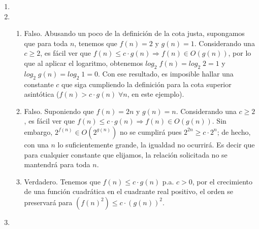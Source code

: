 \documentclass[12pt]{article}
\newenvironment{boenumerate}
               {\begin{enumerate}\renewcommand\labelenumi{\textbf{\theenumi.}}}
               {\end{enumerate}}
\begin{document}
\begin{boenumerate}
  Ahora veamos que $f_1(n) = n^{2.5} = n^{2+0.5} = n^2 \cdot n^{\frac{1}{2}}$, comparándolo con $f_6(n)$, al tener que $log_2(n) \leq n^{\frac{1}{2}} \Rightarrow n^2logn \leq n^{2.5}$, y notando que para valores mayores a $4$, $f_1(n)$ es mayor siempre que $f_6(n)$, podemos concluir que $f_6(n) \in O(f_1(n))$.
  
  Hemos visto en clase que $n^2 \in O(n^2logn)$ y que $n \in O(n^2)$. Por transitividad, podemos ver que 
  $f_3(n) \in O(f_6(n))$. De cualquier manera, podemos ver que a partir de valores como 3, $f_6$ será siempre mayor a $f_3$.
  

  Finalmente, es claro que al no estar definidas las raíces negativas en los reales, desde el 0 a valores positivos, la función $f_3$ es mayor a $f_2$.

  Así pues, queda en orden creciente nuestra lista de funciones como sigue:
  $f_2,f_3,f_6,f_1,f_4,f_5$.
\item
\item
  \begin{enumerate}
  \item Falso. Abusando un poco de la definición de la cota justa, supongamos que para toda $n$, tenemos que $f(n) = 2$ y 
    $g(n) = 1$. Considerando una $c \geq 2$, es fácil ver que $f(n) \leq c \cdot g(n) \Rightarrow f(n) \in O(g(n))$, por lo que al aplicar el logaritmo, obtenemos $log_2\;f(n) = log_2\; 2 = 1$ y $log_2\;g(n) = log_2\; 1 = 0$. Con ese resultado, es imposible hallar una constante $c$ que siga cumpliendo la definición para la cota superior asintótica ($f(n) > c\cdot g(n) \;\forall n$, en este ejemplo).
  \item Falso. Suponiendo que $f(n) = 2n$ y $g(n) = n$. Considerando una $c \geq 2$, es fácil ver que $f(n) \leq c \cdot g(n) \Rightarrow f(n) \in O(g(n))$. Sin embargo, $2^{f(n)} \in O(2^{g(n)})$ no se cumplirá
    pues $2^{2n} \geq c \cdot 2^n$; de hecho, con una $n$ lo suficientemente grande, la igualdad no ocurrirá. Es decir que para cualquier constante que elijamos, la relación solicitada no se mantendrá para toda $n$.
  \item Verdadero. Tenemos que $f(n) \leq c \cdot g(n)$ p.a. $c > 0$, por el crecimiento
    de una función cuadrática en el cuadrante real positivo, el orden se preservará para
    $(f(n)^2) \leq c \cdot (g(n))^2$.
  \end{enumerate}
\item
\end{boenumerate}
\end{document}
